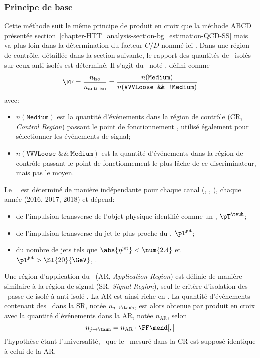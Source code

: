 \subsubsection{Principe de base}
Cette méthode suit le même principe de produit en croix que la méthode \og ABCD \fg{} présentée section~\ref{chapter-HTT_analysis-section-bg_estimation-QCD-SS} mais va plus loin dans la détermination du facteur $C/D$ nommé ici \fakefactor.
Dans une région de contrôle, détaillée dans la section suivante, le rapport des quantités de \tauh\ isolés sur ceux anti-isolés est déterminé.
Il s'agit du \fakefactor\, noté \FF, défini comme
\begin{equation}
\FF = \frac{n_\text{iso}}{n_\text{anti-iso}} = \frac{n(\texttt{Medium})}{n(\texttt{VVVLoose \&\& !Medium})}
\label{eq-chapter-HTT_analysis-section-bg_estimation-FF_method-FF_def_global}
\end{equation}
avec:
\begin{itemize}
\item $n(\texttt{Medium})$ est la quantité d'événements dans la région de contrôle (CR, \emph{Control Region}) passant le point de fonctionnement , utilisé également pour sélectionner les événements de signal;
\item $n(\texttt{VVVLoose \&\& !Medium})$ est la quantité d'événements dans la région de contrôle passant le point de fonctionnement le plus lâche de ce discriminateur, mais pas le moyen.
\end{itemize}
Le \fakefactor\ \FF\ est déterminé de manière indépendante pour chaque canal (\tauh\tauh, \mu\tauh, \ele\tauh), chaque année (2016, 2017, 2018) et dépend:
\begin{itemize}
\item de l'impulsion transverse de l'objet physique identifié comme un \tauh, $\pT^{\tauh}$;
\item de l'impulsion transverse du jet le plus proche du \tauh, $\pT^\text{jet}$;
\item du nombre de jets tels que $\abs{\eta^\text{jet}}<\num{2.4}$ et $\pT^\text{jet}>\SI{20}{\GeV}$, \Nprebjets.
\end{itemize}
\par
Une région d'application du \fakefactor\ (AR, \emph{Application Region}) est définie de manière similaire à la région de signal (SR, \emph{Signal Region}), seul le critère d'isolation des \tauh\ passe de \og isolé \fg{}  à \og anti-isolé \fg.
La AR est ainsi riche en \ftauhs.
La quantité d'événements contenant des \ftauhs\ dans la SR, notée $n_{j\to\tauh}$, est alors obtenue par produit en croix avec la quantité d'événements dans la AR, notée $n_\text{AR}$,  selon
\begin{equation}
n_{j\to\tauh} = n_\text{AR} \cdot \FF
\mend[,]
\end{equation}
l'hypothèse étant l'universalité, \ie\ que le \fakefactor\ mesuré dans la CR est supposé identique à celui de la AR.
